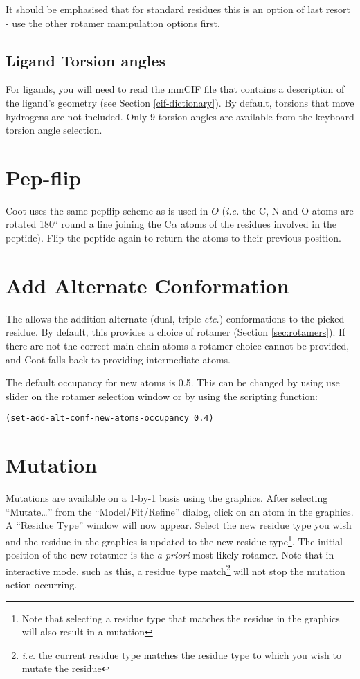 \documentclass{book}
\begin{document}
It should be emphasised that for standard residues this is an option
of last resort - use the other rotamer manipulation options first.

\subsection{Ligand Torsion angles}
For
ligands, you will need to read the mmCIF file that contains a
description of the ligand's geometry (see Section
\ref{cif-dictionary}).  By default, torsions that move hydrogens are
not included.  Only 9 torsion angles are available from the keyboard
torsion angle selection.

\section{Pep-flip}
 Coot uses the same pepflip scheme
as is used in $O$ (\emph{i.e.} the C, N and O atoms are rotated
180$^o$ round a line joining the C$\alpha$ atoms of the residues
involved in the peptide).  Flip the peptide again to return the atoms
to their previous position.


\section{Add Alternate Conformation}
\label{sec:add_alt_conf}
The allows the addition alternate (dual,
triple \emph{etc.})  conformations to the picked residue.  By default,
this provides a choice of rotamer (Section \ref{sec:rotamers}).  If
there are not the correct main chain atoms a rotamer choice cannot be
provided, and Coot falls back to providing intermediate atoms.

The default occupancy for new atoms is 0.5.  This can be changed by
using use slider on the rotamer selection window or by using the
scripting function:

\texttt{(set-add-alt-conf-new-atoms-occupancy 0.4)}




\section{Mutation}
 Mutations are available on a 1-by-1 basis using the
graphics.  After selecting ``Mutate\ldots'' from the
``Model/Fit/Refine'' dialog, click on an atom in the graphics.  A
``Residue Type'' window will now appear.  Select the new residue type
you wish and the residue in the graphics is updated to the new residue
type\footnote{Note that selecting a residue type that matches the
  residue in the graphics will also result in a mutation}.  The
initial position of the new rotatmer is the \emph{a priori} most
likely rotamer. Note that in interactive mode, such as this, a residue
type match\footnote{\emph{i.e.} the current residue type matches the
  residue type to which you wish to mutate the residue} will not stop
the mutation action occurring.
\end{document}
